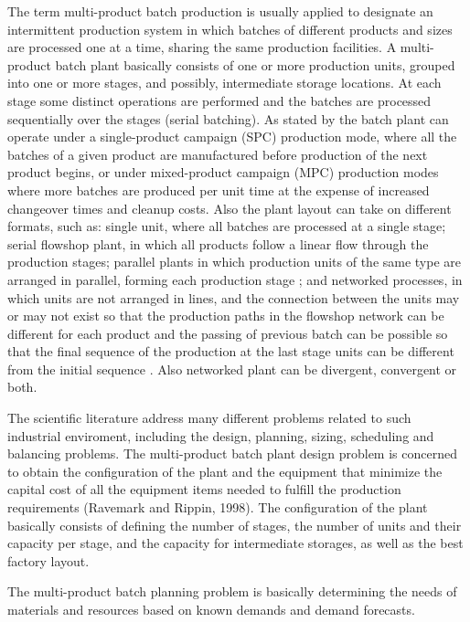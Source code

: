 \documentclass[authoryear,manuscript,12pt]{elsarticle}
\begin{document}
The term multi-product batch production is usually applied to designate an intermittent production system in which batches of different products and sizes are processed one at a time, sharing the same production facilities. A multi-product batch plant basically consists of one or more production units, grouped into one or more stages, and possibly, intermediate storage locations. At each stage some distinct operations are performed and the batches are processed sequentially over the stages (serial batching). As stated by \cite{PetkovMaranas1998} the batch plant can operate under a single-product campaign (SPC) production mode, where all the batches of a given product are manufactured before production of the next product begins, or under mixed-product campaign (MPC) production modes where more batches are produced per unit time at the expense of increased changeover times and cleanup costs. Also the plant layout can take on different formats, such as: single unit, where all batches are processed at a single stage; serial flowshop plant, in which all products follow a linear flow through the production stages; parallel plants in which production units of the same type are arranged in parallel, forming each production stage \citep{ShiEtAll2017}; and networked processes, in which units are not arranged in lines, and the connection between the units may or may not exist so that the production paths in the flowshop network can be different for each product and the passing of previous batch can be possible so that the final sequence of the production at the last stage units can be different from the initial sequence \citep{KimEtAl1996}. Also networked plant can be divergent, convergent or both.

The scientific literature address many different problems related to such industrial enviroment, including the design, planning, sizing, scheduling and balancing problems. The multi-product batch plant design problem is concerned to obtain the configuration of the plant and the equipment that minimize the capital cost of all the equipment items needed to fulfill the production requirements (Ravemark and Rippin, 1998). The configuration of the plant basically consists of defining the number of stages, the number of units and their capacity per stage, and the capacity for intermediate storages, as well as the best factory layout. 

The multi-product batch planning problem is basically determining the needs of materials and resources based on known demands and demand forecasts. 
\end{document}
